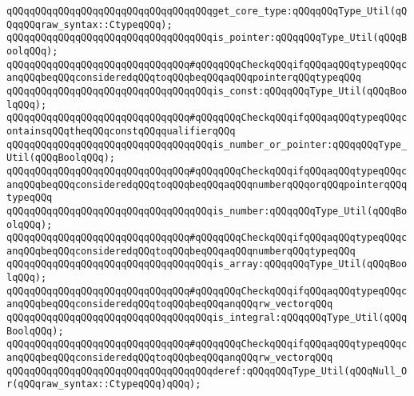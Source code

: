 \newline
\verb|qQQqqQQqqQQqqQQqqQQqqQQqqQQqqQQqqQQqget_core_type:qQQqqQQqType_Util(qQQqqQQqraw_syntax::CtypeqQQq);|\newline
\newline
\verb|qQQqqQQqqQQqqQQqqQQqqQQqqQQqqQQqqQQqis_pointer:qQQqqQQqType_Util(qQQqBoolqQQq);|\newline
\verb|qQQqqQQqqQQqqQQqqQQqqQQqqQQqqQQq#qQQqqQQqCheckqQQqifqQQqaqQQqtypeqQQqcanqQQqbeqQQqconsideredqQQqtoqQQqbeqQQqaqQQqpointerqQQqtypeqQQq|\newline
\newline
\verb|qQQqqQQqqQQqqQQqqQQqqQQqqQQqqQQqqQQqis_const:qQQqqQQqType_Util(qQQqBoolqQQq);|\newline
\verb|qQQqqQQqqQQqqQQqqQQqqQQqqQQqqQQq#qQQqqQQqCheckqQQqifqQQqaqQQqtypeqQQqcontainsqQQqtheqQQqconstqQQqqualifierqQQq|\newline
\newline
\verb|qQQqqQQqqQQqqQQqqQQqqQQqqQQqqQQqqQQqis_number_or_pointer:qQQqqQQqType_Util(qQQqBoolqQQq);|\newline
\verb|qQQqqQQqqQQqqQQqqQQqqQQqqQQqqQQq#qQQqqQQqCheckqQQqifqQQqaqQQqtypeqQQqcanqQQqbeqQQqconsideredqQQqtoqQQqbeqQQqaqQQqnumberqQQqorqQQqpointerqQQqtypeqQQq|\newline
\newline
\verb|qQQqqQQqqQQqqQQqqQQqqQQqqQQqqQQqqQQqis_number:qQQqqQQqType_Util(qQQqBoolqQQq);|\newline
\verb|qQQqqQQqqQQqqQQqqQQqqQQqqQQqqQQq#qQQqqQQqCheckqQQqifqQQqaqQQqtypeqQQqcanqQQqbeqQQqconsideredqQQqtoqQQqbeqQQqaqQQqnumberqQQqtypeqQQq|\newline
\newline
\verb|qQQqqQQqqQQqqQQqqQQqqQQqqQQqqQQqqQQqis_array:qQQqqQQqType_Util(qQQqBoolqQQq);|\newline
\verb|qQQqqQQqqQQqqQQqqQQqqQQqqQQqqQQq#qQQqqQQqCheckqQQqifqQQqaqQQqtypeqQQqcanqQQqbeqQQqconsideredqQQqtoqQQqbeqQQqanqQQqrw_vectorqQQq|\newline
\newline
\verb|qQQqqQQqqQQqqQQqqQQqqQQqqQQqqQQqqQQqis_integral:qQQqqQQqType_Util(qQQqBoolqQQq);|\newline
\verb|qQQqqQQqqQQqqQQqqQQqqQQqqQQqqQQq#qQQqqQQqCheckqQQqifqQQqaqQQqtypeqQQqcanqQQqbeqQQqconsideredqQQqtoqQQqbeqQQqanqQQqrw_vectorqQQq|\newline
\newline
\verb|qQQqqQQqqQQqqQQqqQQqqQQqqQQqqQQqqQQqderef:qQQqqQQqType_Util(qQQqNull_Or(qQQqraw_syntax::CtypeqQQq)qQQq);|\newline
